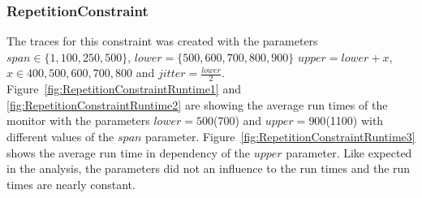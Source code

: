 \subsubsection{RepetitionConstraint}
	The traces for this constraint was created with the parameters $span\in\{1,100,250,500\}$, $lower=\{500,600,700,800,900\}$ $upper=lower+x$, $x\in{400,500,600,700,800}$ and $jitter=\frac{lower}{2}$.\\
	Figure~\ref{fig:RepetitionConstraintRuntime1} and \ref{fig:RepetitionConstraintRuntime2} are showing the average run times of the monitor with the parameters $lower=500$(700) and $upper=900$(1100) with different values of the $span$ parameter. Figure~\ref{fig:RepetitionConstraintRuntime3} shows the average run time in dependency of the $upper$ parameter. Like expected in the analysis, the parameters did not an influence to the run times and the run times are nearly constant.
